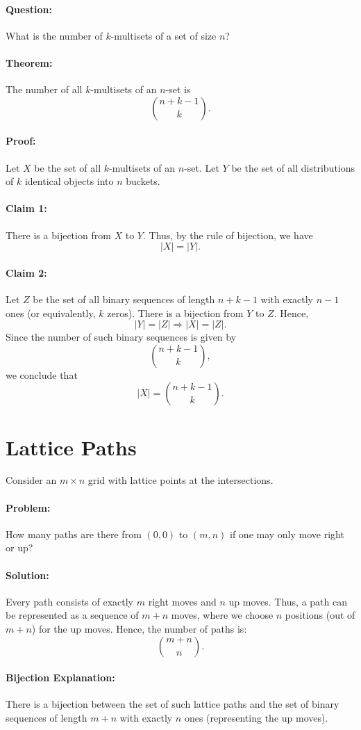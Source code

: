 \paragraph{Question:}  
What is the number of \( k \)-multisets of a set of size \( n \)?  

\paragraph{Theorem:}  
The number of all \( k \)-multisets of an \( n \)-set is  
\[
\binom{n+k-1}{k}.
\]  

\paragraph{Proof:}  
Let \( X \) be the set of all \( k \)-multisets of an \( n \)-set.  
Let \( Y \) be the set of all distributions of \( k \) identical objects into \( n \) buckets.  

\paragraph{Claim 1:}  
There is a bijection from \( X \) to \( Y \).  
Thus, by the rule of bijection, we have  
\[
|X| = |Y|.
\]  

\paragraph{Claim 2:}  
Let \( Z \) be the set of all binary sequences of length \( n+k-1 \) with exactly \( n-1 \) ones (or equivalently, \( k \) zeros).  
There is a bijection from \( Y \) to \( Z \).  
Hence,  
\[
|Y| = |Z| \Rightarrow |X| = |Z|.
\]  
Since the number of such binary sequences is given by  
\[
\binom{n+k-1}{k},
\]  
we conclude that  
\[
|X| = \binom{n+k-1}{k}.
\]


\section{Lattice Paths}
Consider an $m \times n$ grid with lattice points at the intersections.  
\paragraph{Problem:}  
How many paths are there from $(0,0)$ to $(m,n)$ if one may only move right or up?
\paragraph{Solution:}  
Every path consists of exactly $m$ right moves and $n$ up moves. Thus, a path can be represented as a sequence of $m+n$ moves, where we choose $n$ positions (out of $m+n$) for the up moves. Hence, the number of paths is:
\[
\binom{m+n}{n}.
\]

\paragraph{Bijection Explanation:}  
There is a bijection between the set of such lattice paths and the set of binary sequences of length $m+n$ with exactly $n$ ones (representing the up moves).
